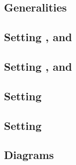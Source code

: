 \subsection{Generalities}                                                                                    \label{bls: generalities for malformed and wellformed}      
\subsection{Setting \malformedDataInternalBit, \malformedDataInternalAcc{} and \malformedDataInternalTot}    \label{bls: malformed internal bit acc justification}       
\subsection{Setting \malformedDataExternalBit, \malformedDataExternalAcc{} and \malformedDataExternalTot}    \label{bls: malformed external bit acc justification}       
\subsection{Setting \nontrivialPairOfPointsBit{}}                                                            \label{bls: setting nontrivial pair of points bit}          
\subsection{Setting \nontrivialPairOfPointsAcc{}}                                                            \label{bls: setting nontrivial pair of points acc}          
\subsection{Diagrams}                                                                                        \label{bls: setting diagrams}                               
                                                                                                                                                                         
